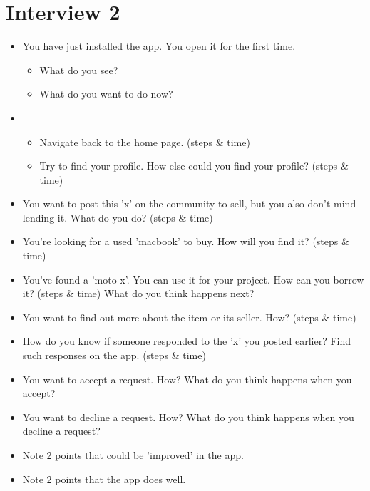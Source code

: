 \section{Interview 2}
\label{sec:interview2}
\begin{itemize}
	\item {You have just installed the app. You open it for the first time.
		\begin{itemize}
			\item What do you see?
			\item What do you want to do now?
		\end{itemize}
		}
	\item {
		\begin{itemize}
			\item Navigate back to the home page. (steps \& time)
			\item Try to find your profile. How else could you find your profile? (steps \& time)
		\end{itemize}
		}
	\item You want to post this 'x' on the community to sell, but you also don't mind lending it. What do you do? (steps \& time)
	\item You're looking for a used 'macbook' to buy. How will you find it? (steps \& time)
	\item You've found a 'moto x'. You can use it for your project. How can you borrow it? (steps \& time) What do you think happens next?
	\item You want to find out more about the item or its seller. How? (steps \& time)
	\item How do you know if someone responded to the 'x' you posted earlier? Find such responses on the app. (steps \& time)
	\item You want to accept a request. How? What do you think happens when you accept?
	\item You want to decline a request. How? What do you think happens when you decline a request?
	\item Note 2 points that could be 'improved' in the app.
	\item Note 2 points that the app does well. 
\end{itemize}